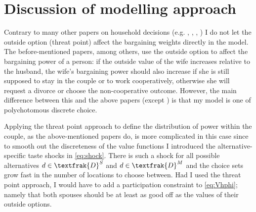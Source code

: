 \section{Discussion of modelling approach}\label{sec:modeldisc}
Contrary to many other papers on household decisions (e.g. \cite{Voena2015}, \cite{DelbocaFlinn2012}, \cite{Gemici2011}, \cite{LundbergPollak1993}) I do not let the outside option (threat point) affect the bargaining weights directly in the model. The before-mentioned papers, among others, use the outside option to affect the bargaining power of a person: if the outside value of the wife increases relative to the husband, the wife's bargaining power should also increase if she is still supposed to stay in the couple or to work cooperatively, otherwise she will request a divorce or choose the non-cooperative outcome. However, the main difference between this and the above papers (except \cite{Gemici2011}) is that my model is one of polychotomous discrete choice. 

Applying the threat point approach to define the distribution of power within the couple, as the above-mentioned papers do, is more complicated in this case since to smooth out the discreteness of the value functions I introduced the alternative-specific taste shocks in \eqref{eq:shock}. There is such a shock for all possible alternatives $d \in \textfrak{D}^S$ and $d\in\textfrak{D}^M$ and the choice sets grow fast in the number of locations to choose between. Had I used the threat point approach, I would have to add a participation constraint to \eqref{eq:Vhphi}; namely that both spouses should be at least as good off as the values of their outside options. 



